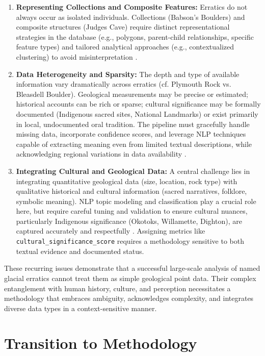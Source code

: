 \begin{enumerate}
    \item \textbf{Representing Collections and Composite Features:} Erratics do not always occur as isolated individuals. Collections (Babson's Boulders) and composite structures (Judges Cave) require distinct representational strategies in the database (e.g., polygons, parent-child relationships, specific feature types) and tailored analytical approaches (e.g., contextualized clustering) to avoid misinterpretation \cite{wburMysteriousBoulders, Dana1891}.
    \item \textbf{Data Heterogeneity and Sparsity:} The depth and type of available information vary dramatically across erratics (cf. Plymouth Rock vs. Bleasdell Boulder). Geological measurements may be precise or estimated; historical accounts can be rich or sparse; cultural significance may be formally documented (Indigenous sacred sites, National Landmarks) or exist primarily in local, undocumented oral tradition. The pipeline must gracefully handle missing data, incorporate confidence scores, and leverage NLP techniques capable of extracting meaning even from limited textual descriptions, while acknowledging regional variations in data availability \cite{LTCBleasdell, Delcourt1991}.
    \item \textbf{Integrating Cultural and Geological Data:} A central challenge lies in integrating quantitative geological data (size, location, rock type) with qualitative historical and cultural information (sacred narratives, folklore, symbolic meaning). NLP topic modeling and classification play a crucial role here, but require careful tuning and validation to ensure cultural nuances, particularly Indigenous significance (Okotoks, Willamette, Dighton), are captured accurately and respectfully \cite{Delcourt1991, Klassen1995, ourtimebdTomanowosMeteorite, statesmanjournalPiecesSacred}. Assigning metrics like \texttt{cultural\_significance\_score} requires a methodology sensitive to both textual evidence and documented status.
\end{enumerate}

These recurring issues demonstrate that a successful large-scale analysis of named glacial erratics cannot treat them as simple geological point data. Their complex entanglement with human history, culture, and perception necessitates a methodology that embraces ambiguity, acknowledges complexity, and integrates diverse data types in a context-sensitive manner.

\section{Transition to Methodology}
\label{sec:transition}

